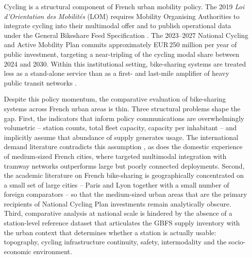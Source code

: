 \documentclass[11pt,a4paper]{article}
\begin{document}
Cycling is a structural component of French urban mobility policy.
The 2019 \emph{Loi d'Orientation des Mobilit\'es} (LOM) requires
Mobility Organising Authorities to integrate cycling into their
multimodal offer and to publish operational data under the General
Bikeshare Feed Specification \citep[GBFS;][]{Mobi2024}. The
2023--2027 National Cycling and Active Mobility Plan commits
approximately EUR\,250 million per year of public investment,
targeting a near-tripling of the cycling modal share between
2024 and 2030. Within this institutional setting, bike-sharing
systems are treated less as a stand-alone service than as a
first- and last-mile amplifier of heavy public transit networks
\citep{Fishman2016, Saberi2018}.

Despite this policy momentum, the comparative evaluation of
bike-sharing systems across French urban areas is thin. Three
structural problems shape the gap. First, the indicators that
inform policy communications are overwhelmingly volumetric --
station counts, total fleet capacity, capacity per inhabitant --
and implicitly assume that abundance of supply generates usage.
The international demand literature contradicts this assumption
\citep{FaghihImani2014, FaghihImani2015, Eren2020}, as does the
domestic experience of medium-sized French cities, where targeted
multimodal integration with tramway networks outperforms large but
poorly connected deployments. Second, the academic literature on
French bike-sharing is geographically concentrated on a small set
of large cities -- Paris \citep{Borgnat2011, Etienne2014} and Lyon
\citep{Borgnat2011} together with a small number of foreign
comparators \citep{Vogel2011, Hampshire2012} -- so that the
medium-sized urban areas that are the primary recipients of
National Cycling Plan investments remain analytically obscure.
Third, comparative analysis at national scale is hindered by the
absence of a station-level reference dataset that articulates the
GBFS supply inventory with the urban context that determines
whether a station is actually usable: topography, cycling
infrastructure continuity, safety, intermodality and the
socio-economic environment.
\end{document}
